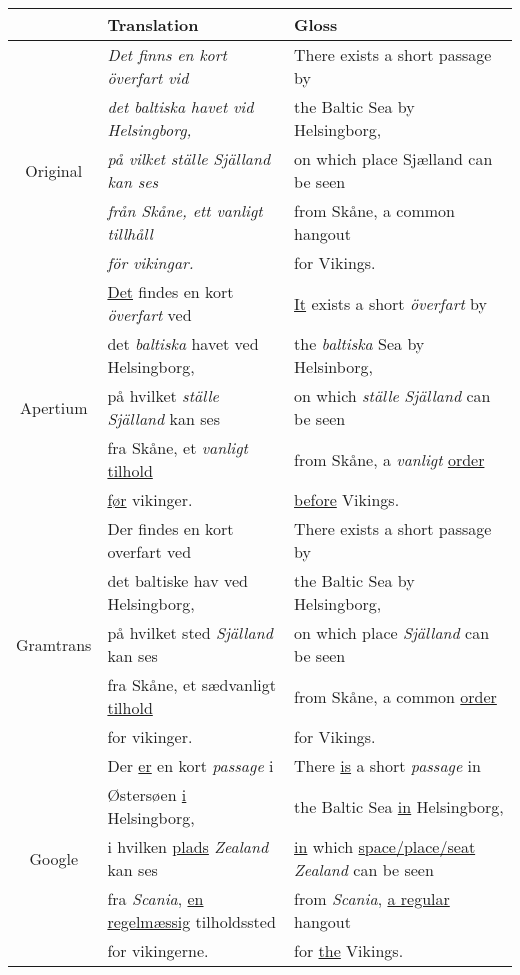 \documentclass[11pt]{article}
\begin{document}
\begin{table*}
 \begin{tabular}{|c|l|l|}
\hline
           & Translation                                & Gloss \\
\hline
~          & \emph{Det finns en kort överfart vid}      & There exists a short passage by \\
~          & \emph{det baltiska havet vid Helsingborg,} & the Baltic Sea by Helsingborg, \\
Original   & \emph{på vilket ställe Själland kan ses }  & on which place Sjælland can be seen \\ 
~          & \emph{från Skåne, ett vanligt tillhåll }   & from Skåne, a common hangout \\ 
~          & \emph{för vikingar.}                       & for Vikings.\\
\hline
~          & \underline{Det} findes en kort \emph{överfart} ved    & \underline{It} exists a short \emph{överfart} by \\
~          & det \emph{baltiska} havet ved Helsingborg,            & the \emph{baltiska} Sea by Helsinborg, \\
Apertium   & på hvilket \emph{ställe} \emph{Själland} kan ses      & on which \emph{ställe} \emph{Själland} can be seen \\
~          & fra Skåne, et \emph{vanligt} \underline{tilhold}      & from Skåne, a \emph{vanligt} \underline{order} \\
~          & \underline{før} vikinger.                             & \underline{before} Vikings.\\
\hline
~          & Der findes en kort overfart ved                  & There exists a short passage by \\
~          & det baltiske hav ved Helsingborg,                & the Baltic Sea by Helsingborg, \\
Gramtrans  & på hvilket sted \emph{Själland} kan ses          & on which place \emph{Själland} can be seen \\ 
~          & fra Skåne, et sædvanligt \underline{tilhold}     & from Skåne, a common \underline{order} \\
~          & for vikinger.                                    & for Vikings. \\
\hline
~          & Der \underline{er} en kort \emph{passage} i      & There \underline{is} a short \emph{passage} in \\
~          & Østersøen \underline{i} Helsingborg,             & the Baltic Sea \underline{in} Helsingborg, \\
Google     & i hvilken \underline{plads} \emph{Zealand} kan ses           & \underline{in} which \underline{space/place/seat} \emph{Zealand} can be seen \\ 
~          & fra \emph{Scania}, \underline{en regelmæssig} tilholdssted   & from \emph{Scania}, \underline{a regular} hangout \\
~          & for vikingerne.                                  & for \underline{the} Vikings. \\
\hline 


\end{tabular}
\end{table*}
\end{document}
